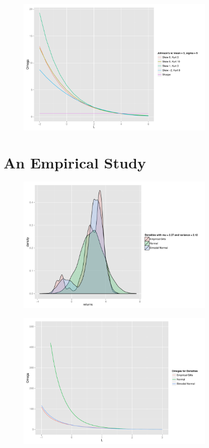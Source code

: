 \documentclass{beamer}
\begin{document}
\begin{frame}
\begin{figure}
\includegraphics[width=3.75in]{plots/Preferences.pdf}
\end{figure}
\end{frame}

\section{An Empirical Study}

\begin{frame}
\begin{figure}
\includegraphics[width=3.75in]{plots/EmpiricalDensities.pdf}
\end{figure}
\end{frame}

\begin{frame}
\begin{figure}
\includegraphics[width=3.75in]{plots/EmpiricalOmegas.pdf}
\end{figure}
\end{frame}
\end{document}
